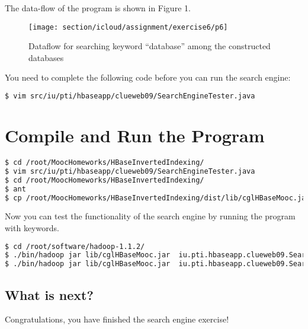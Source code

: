 The data-flow of the program is shown in Figure 1.

\begin{figure}[!htbp]
\texttt{[image: section/icloud/assignment/exercise6/p6]}
\centering
\caption{Dataflow for searching keyword ``database'' among the constructed databases}
\end{figure}

You need to complete the following code before you can run the search engine:
\begin{lstlisting}[language=bash]
$ vim src/iu/pti/hbaseapp/clueweb09/SearchEngineTester.java
\end{lstlisting}



\section*{Compile and Run the Program}
\begin{lstlisting}[language=bash]
$ cd /root/MoocHomeworks/HBaseInvertedIndexing/
$ vim src/iu/pti/hbaseapp/clueweb09/SearchEngineTester.java
$ cd /root/MoocHomeworks/HBaseInvertedIndexing/
$ ant
$ cp /root/MoocHomeworks/HBaseInvertedIndexing/dist/lib/cglHBaseMooc.jar /root/software/hadoop-1.1.2/lib/
\end{lstlisting}

Now you can test the functionality of the search engine by running the program
with keywords.

\begin{lstlisting}[language=bash]
$ cd /root/software/hadoop-1.1.2/
$ ./bin/hadoop jar lib/cglHBaseMooc.jar  iu.pti.hbaseapp.clueweb09.SearchEngineTester search-keyword snapshot
$ ./bin/hadoop jar lib/cglHBaseMooc.jar  iu.pti.hbaseapp.clueweb09.SearchEngineTester get-page-snapshot 00000113548 |  grep snapshot
\end{lstlisting}

\subsection*{What is next?}
Congratulations, you have finished the search engine exercise!
